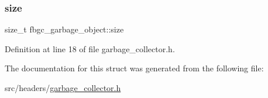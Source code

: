 \mbox{\label{structfbgc__garbage__object_a8f87f80616e58f0aa24b659e94be483c}} 
\subsubsection{\texorpdfstring{size}{size}}
{\footnotesize\ttfamily size\+\_\+t fbgc\+\_\+garbage\+\_\+object\+::size}



Definition at line 18 of file garbage\+\_\+collector.\+h.



The documentation for this struct was generated from the following file\+:\begin{DoxyCompactItemize}
\item 
src/headers/\hyperlink{garbage__collector_8h}{garbage\+\_\+collector.\+h}\end{DoxyCompactItemize}
